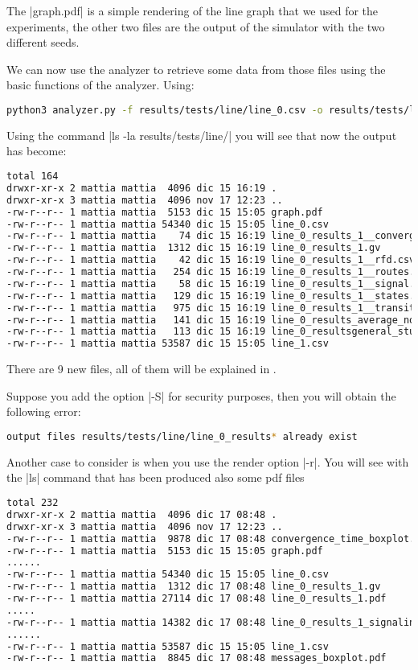 \documentclass[10pt,journal,onecolumn]{IEEEtran}
\begin{document}
The |graph.pdf| is a simple rendering of the line graph that we used for the
experiments, the other two files are the output of the simulator with the 
two different seeds.

We can now use the analyzer to retrieve some data from those files using the basic
functions of the analyzer.
Using:
\begin{lstlisting}[language=bash]
python3 analyzer.py -f results/tests/line/line_0.csv -o results/tests/line/line_0_results -n 1
\end{lstlisting}
Using the command |ls -la results/tests/line/| you will see that now the 
output has become:
\begin{lstlisting}[language=bash]
total 164
drwxr-xr-x 2 mattia mattia  4096 dic 15 16:19 .
drwxr-xr-x 3 mattia mattia  4096 nov 17 12:23 ..
-rw-r--r-- 1 mattia mattia  5153 dic 15 15:05 graph.pdf
-rw-r--r-- 1 mattia mattia 54340 dic 15 15:05 line_0.csv
-rw-r--r-- 1 mattia mattia    74 dic 15 16:19 line_0_results_1__convergence.csv
-rw-r--r-- 1 mattia mattia  1312 dic 15 16:19 line_0_results_1.gv
-rw-r--r-- 1 mattia mattia    42 dic 15 16:19 line_0_results_1__rfd.csv
-rw-r--r-- 1 mattia mattia   254 dic 15 16:19 line_0_results_1__routes.csv
-rw-r--r-- 1 mattia mattia    58 dic 15 16:19 line_0_results_1__signal.csv
-rw-r--r-- 1 mattia mattia   129 dic 15 16:19 line_0_results_1__states.csv
-rw-r--r-- 1 mattia mattia   975 dic 15 16:19 line_0_results_1__transitions.csv
-rw-r--r-- 1 mattia mattia   141 dic 15 16:19 line_0_results_average_node_convergence.csv
-rw-r--r-- 1 mattia mattia   113 dic 15 16:19 line_0_resultsgeneral_study.csv
-rw-r--r-- 1 mattia mattia 53587 dic 15 15:05 line_1.csv
\end{lstlisting}
There are \num{9} new files, all of them will be explained in .

Suppose you add the option |-S| for security purposes, then you will obtain the
following error:
\begin{lstlisting}[language=bash]
output files results/tests/line/line_0_results* already exist
\end{lstlisting}

Another case to consider is when you use the render option |-r|.
You will see with the |ls| command that has been produced also some pdf files
\begin{lstlisting}[language=bash]
total 232
drwxr-xr-x 2 mattia mattia  4096 dic 17 08:48 .
drwxr-xr-x 3 mattia mattia  4096 nov 17 12:23 ..
-rw-r--r-- 1 mattia mattia  9878 dic 17 08:48 convergence_time_boxplot.pdf
-rw-r--r-- 1 mattia mattia  5153 dic 15 15:05 graph.pdf
......
-rw-r--r-- 1 mattia mattia 54340 dic 15 15:05 line_0.csv
-rw-r--r-- 1 mattia mattia  1312 dic 17 08:48 line_0_results_1.gv
-rw-r--r-- 1 mattia mattia 27114 dic 17 08:48 line_0_results_1.pdf
.....
-rw-r--r-- 1 mattia mattia 14382 dic 17 08:48 line_0_results_1_signaling_nmessage_prob.pdf
......
-rw-r--r-- 1 mattia mattia 53587 dic 15 15:05 line_1.csv
-rw-r--r-- 1 mattia mattia  8845 dic 17 08:48 messages_boxplot.pdf
\end{lstlisting}
\end{document}
